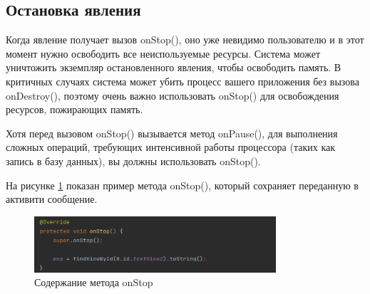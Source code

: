 \subsection{Остановка явления}
Когда явление получает вызов onStop(), оно уже невидимо пользователю и
в этот момент нужно освободить все неиспользуемые ресурсы. Система может
уничтожить экземпляр остановленного явления, чтобы освободить память. В
критичных случаях система может убить процесс вашего приложения без
вызова onDestroy(), поэтому очень важно использовать onStop() для
освобождения ресурсов, пожирающих память.\par
Хотя перед вызовом onStop() вызывается метод onPause(), для выполнения
сложных операций, требующих интенсивной работы процессора (таких как
запись в базу данных), вы должны использовать onStop().\par
На рисунке \ref{fig:activity:onStop:content} показан пример метода onStop(),
который сохраняет переданную в активити сообщение.
\begin{figure}[h!tp]
	\centering
	\includegraphics[width=0.8\textwidth]{Screenshot from 2023-02-22 20-10-08.png}
	\caption{Содержание метода onStop}
	\label{fig:activity:onStop:content}
\end{figure}

